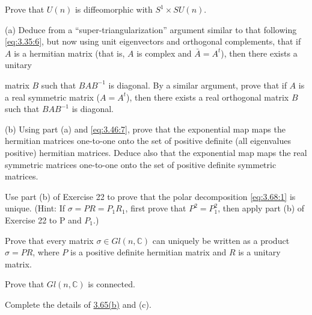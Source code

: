 \begin{problemset}
\item Prove that  $ U(n) $ is diffeomorphic with  $ S^{1} \times SU(n) $.

\item (a) Deduce from a “super-triangularization” argument similar to that following \eqref{eq:3.35:6}, but now using unit eigenvectors and orthogonal complements, that if $A$ is a hermitian matrix (that is, $A$ is complex and $\bar{A}=A^{t}$), then there exists a unitary

matrix $B$ such that $BAB^{-1}$ is diagonal. By a similar argument, prove that if $A$ is a real symmetric matrix ($A = A^{t}$), then there exists a real orthogonal matrix $B$ such that $BAB^{-1}$ is diagonal.

(b) Using part (a) and \eqref{eq:3.46:7}, prove that the exponential map maps the hermitian matrices one-to-one onto the set of positive definite (all eigenvalues positive) hermitian matrices. Deduce also that the exponential map maps the real symmetric matrices one-to-one onto the set of positive definite symmetric matrices.

\item Use part (b) of Exercise 22 to prove that the polar decomposition \eqref{eq:3.68:1} is unique. (Hint: If  $ \sigma = PR = P_{1}R_{1} $, first prove that  $ P^{2} = P_{1}^{2} $, then apply part (b) of Exercise 22 to P and  $ P_{1} $.)

\item Prove that every matrix  $ \sigma \in Gl(n, \mathbb{C}) $ can uniquely be written as a product  $ \sigma = PR $, where  $ P $ is a positive definite hermitian matrix and  $ R $ is a unitary matrix.

\item Prove that $Gl(n,\mathbb{C})$ is connected.

\item Complete the details of \hyperref[thm:3.65]{3.65(b)} and (c).

\end{problemset}
